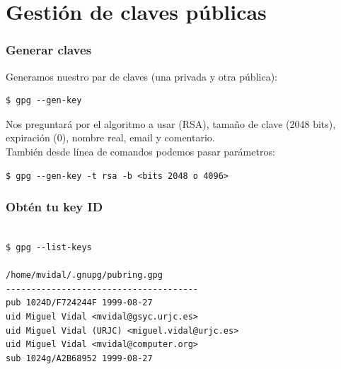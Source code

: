 \documentclass{beamer}
\begin{document}
\section{Gestión de claves públicas}

\begin{frame}[fragile]
\frametitle{Generar claves}

Generamos nuestro par de claves (una privada y otra pública): 



\begin{lstlisting}[frame=trBL]
$ gpg --gen-key
\end{lstlisting}

\bigskip

Nos preguntará por el algoritmo a usar (RSA), tamaño de clave (2048 bits), expiración (0), nombre real, email y comentario. \\
\medskip
También desde línea de comandos podemos pasar parámetros:
\begin{lstlisting}[frame=trBL]
$ gpg --gen-key -t rsa -b <bits 2048 o 4096>
\end{lstlisting}

\end{frame}


\begin{frame}[fragile]
\frametitle{Obtén tu key ID}



\begin{lstlisting}[frame=trBL]

$ gpg --list-keys

/home/mvidal/.gnupg/pubring.gpg
--------------------------------------
pub 1024D/F724244F 1999-08-27
uid Miguel Vidal <mvidal@gsyc.urjc.es>
uid Miguel Vidal (URJC) <miguel.vidal@urjc.es>
uid Miguel Vidal <mvidal@computer.org>
sub 1024g/A2B68952 1999-08-27

\end{lstlisting}

\end{frame}
\end{document}
